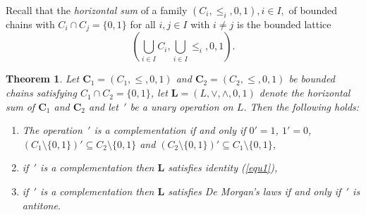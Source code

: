 \documentclass[12pt]{article}
\newtheorem{theorem}{Theorem}[section]
\begin{document}
Recall that the {\em horizontal sum} of a family $(C_i,\le_i,0,1),i\in I,$ of bounded chains with $C_i\cap C_j=\{0,1\}$ for all $i,j\in I$ with $i\ne j$ is the bounded lattice
\[
\left(\bigcup_{i\in I}C_i,\bigcup_{i\in I}\le_i,0,1\right).
\]

\begin{theorem}\label{th2}
Let $\mathbf C_1=(C_1,\le,0,1)$ and $\mathbf C_2=(C_2,\le,0,1)$ be bounded chains satisfying $C_1\cap C_2=\{0,1\}$, let $\mathbf L=(L,\vee,\wedge,0,1)$ denote the horizontal sum of $\mathbf C_1$ and $\mathbf C_2$ and let $\,'$ be a unary operation on $L$. Then the following holds:
\begin{enumerate}[{\rm(i)}]
\item The operation $\,'$ is a complementation if and only if $0'=1$, $1'=0$, $(C_1\setminus\{0,1\})'\subseteq C_2\setminus\{0,1\}$ and $(C_2\setminus\{0,1\})'\subseteq C_1\setminus\{0,1\}$,
\item if $\,'$ is a complementation then $\mathbf L$ satisfies identity {\rm(\ref{equ1})},
\item if $\,'$ is a complementation then $\mathbf L$ satisfies De Morgan's laws if and only if $\,'$ is antitone.
\end{enumerate}
\end{theorem}
\end{document}
